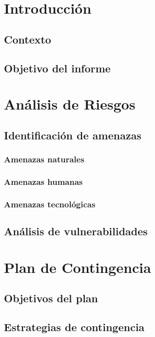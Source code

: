 \section{Introducción}
    \subsection{Contexto}
    
    
    \subsection{Objetivo del informe}


\section{Análisis de Riesgos}
    \subsection{Identificación de amenazas}
        \subsubsection{Amenazas naturales}

        
        \subsubsection{Amenazas humanas}

        
        \subsubsection{Amenazas tecnológicas}


    \subsection{Análisis de vulnerabilidades}
    

\section{Plan de Contingencia}
    \subsection{Objetivos del plan}
    
    \subsection{Estrategias de contingencia}

